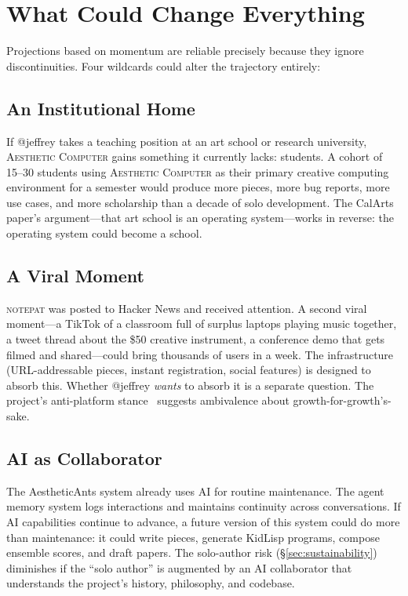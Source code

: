 \documentclass[10pt,letterpaper,twocolumn]{article}
\newcommand{\ac}{\textsc{Aesthetic Computer}}
\newcommand{\np}{\textsc{notepat}}
\begin{document}

\section{What Could Change Everything}
\label{sec:wildcards}

Projections based on momentum are reliable precisely because they ignore discontinuities. Four wildcards could alter the trajectory entirely:

\subsection{An Institutional Home}

If @jeffrey takes a teaching position at an art school or research university, \ac{} gains something it currently lacks: students. A cohort of 15--30 students using \ac{} as their primary creative computing environment for a semester would produce more pieces, more bug reports, more use cases, and more scholarship than a decade of solo development. The CalArts paper's argument---that art school is an operating system---works in reverse: the operating system could become a school.

\subsection{A Viral Moment}

\np{} was posted to Hacker News and received attention. A second viral moment---a TikTok of a classroom full of surplus laptops playing music together, a tweet thread about the \$50 creative instrument, a conference demo that gets filmed and shared---could bring thousands of users in a week. The infrastructure (URL-addressable pieces, instant registration, social features) is designed to absorb this. Whether @jeffrey \emph{wants} to absorb it is a separate question. The project's anti-platform stance~\citep{fisher2009capitalist} suggests ambivalence about growth-for-growth's-sake.

\subsection{AI as Collaborator}

The AestheticAnts system already uses AI for routine maintenance. The agent memory system logs interactions and maintains continuity across conversations. If AI capabilities continue to advance, a future version of this system could do more than maintenance: it could write pieces, generate KidLisp programs, compose ensemble scores, and draft papers. The solo-author risk (\S\ref{sec:sustainability}) diminishes if the ``solo author'' is augmented by an AI collaborator that understands the project's history, philosophy, and codebase.
\end{document}

